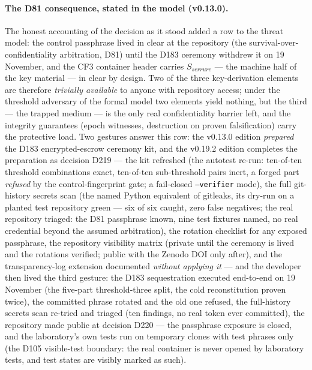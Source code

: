 \documentclass[11pt,a4paper]{article}
\newcommand{\code}[1]{\texttt{\small #1}}
\begin{document}
\paragraph{The D81 consequence, stated in the model (v0.13.0).} The
honest accounting of the decision as it stood added a row to the
threat model: the control passphrase lived in clear at the repository
(the survival-over-confidentiality arbitration, D81) until the D183
ceremony withdrew it on 19 November, and the CF3 container
header carries $S_{serrure}$ --- the machine half of the key material ---
in clear by design. Two of the three key-derivation elements are
therefore \emph{trivially available} to anyone with repository access;
under the threshold adversary of the formal model two elements yield
nothing, but the third --- the trapped medium --- is the only real
confidentiality barrier left, and the integrity guarantees (epoch
witnesses, destruction on proven falsification) carry the protective
load. Two gestures answer this row: the v0.13.0 edition \emph{prepared}
the D183 encrypted-escrow ceremony kit, and the v0.19.2 edition
completes the preparation as decision D219 --- the kit refreshed (the
autotest re-run: ten-of-ten threshold combinations exact, ten-of-ten
sub-threshold pairs inert, a forged part \emph{refused} by the
control-fingerprint gate; a fail-closed \code{--verifier} mode), the
full git-history secrets scan (the named Python equivalent of gitleaks,
its dry-run on a planted test repository green --- six of six caught,
zero false negatives; the real repository triaged: the D81 passphrase
known, nine test fixtures named, no real credential beyond the assumed
arbitration), the rotation checklist for any exposed passphrase, the
repository visibility matrix (private until the ceremony is lived and
the rotations verified; public with the Zenodo DOI only after), and the
transparency-log extension documented \emph{without applying it} ---
and the developer then lived the third gesture: the D183 sequestration
executed end-to-end on 19 November (the five-part threshold-three
split, the cold reconstitution proven twice), the committed phrase
rotated and the old one refused, the full-history secrets scan
re-tried and triaged (ten findings, no real token ever committed), the
repository made public at decision D220 --- the passphrase exposure is
closed, and the laboratory's own tests run on temporary clones with
test phrases only
(the D105 visible-test boundary: the real container is never opened by
laboratory tests, and test states are visibly marked as such).
\end{document}
